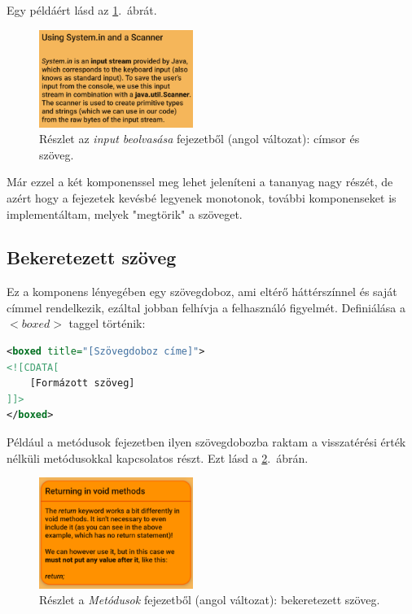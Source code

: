 \documentclass[12pt,a4paper]{article}
\begin{document}
	Egy példáért lásd az \ref{title_component_figure}.\ ábrát.
	
	\begin{figure}[h!]
		\centering
		\includegraphics[width=5cm]{title_text_component}
		\caption{Részlet az \textit{input beolvasása} fejezetből (angol változat): címsor és szöveg.}
		\label{title_component_figure}
	\end{figure}
	
	Már ezzel a két komponenssel meg lehet jeleníteni a tananyag nagy részét, de azért hogy a fejezetek kevésbé legyenek monotonok, további komponenseket is implementáltam, melyek "megtörik" a szöveget. 
	
	\subsection{Bekeretezett szöveg}
	
	Ez a komponens lényegében egy szövegdoboz, ami eltérő háttérszínnel és saját címmel rendelkezik, ezáltal jobban felhívja a felhasználó figyelmét. Definiálása a $<boxed>$ taggel történik:
	
	\bigskip
	\begin{lstlisting}[language=XML]
<boxed title="[Szövegdoboz címe]">
<![CDATA[
	[Formázott szöveg]
]]>
</boxed>	
	\end{lstlisting}
	\bigskip
	
	Például a metódusok fejezetben ilyen szövegdobozba raktam a visszatérési érték nélküli metódusokkal kapcsolatos részt. Ezt lásd a \ref{boxed_component_figure}.\ ábrán.
	
	\begin{figure}[h!]
		\centering
		\includegraphics[width=5cm]{boxed_component}
		\caption{Részlet a \textit{Metódusok} fejezetből (angol változat): bekeretezett szöveg.}
		\label{boxed_component_figure}
	\end{figure}
	
\end{document}
